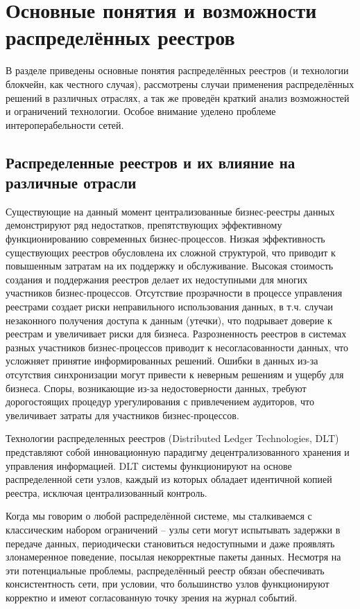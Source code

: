 \chapter{Основные понятия и возможности распределённых реестров}

В разделе приведены основные понятия распределённых реестров (и технологии блокчейн, как честного случая), рассмотрены случаи применения распределённых решений в различных отраслях, а так же проведён краткий анализ возможностей и ограничений технологии. Особое внимание уделено проблеме интероперабельности сетей.

\section{Распределенные реестров и их влияние на различные отрасли}

Существующие на данный момент централизованные бизнес-реестры данных демонстрируют ряд недостатков, препятствующих эффективному функционированию современных бизнес-процессов. Низкая эффективность существующих реестров обусловлена их сложной структурой, что приводит к повышенным затратам на их поддержку и обслуживание. Высокая стоимость создания и поддержания реестров делает их недоступными для многих участников бизнес-процессов. Отсутствие прозрачности в процессе управления реестрами создает риски неправильного использования данных, в т.ч. случаи незаконного получения доступа к данным (утечки), что подрывает доверие к реестрам и увеличивает риски для бизнеса. Разрозненность реестров в системах разных участников бизнес-процессов приводит к несогласованности данных, что усложняет принятие информированных решений. Ошибки в данных из-за отсутствия синхронизации могут привести к неверным решениям и ущербу для бизнеса. Споры, возникающие из-за недостоверности данных, требуют дорогостоящих процедур урегулирования с привлечением аудиторов, что увеличивает затраты для участников бизнес-процессов\cite{label30}.

Технологии распределенных реестров (Distributed Ledger Technologies, DLT) представляют собой инновационную парадигму децентрализованного хранения и управления информацией. DLT системы функционируют на основе распределенной сети узлов, каждый из которых обладает идентичной копией реестра, исключая централизованный контроль\cite{label39}.

Когда мы говорим о любой распределённой системе, мы сталкиваемся с классическим набором ограничений -- узлы сети могут испытывать задержки в передаче данных, периодически становиться недоступными и даже проявлять злонамеренное поведение, посылая некорректные пакеты данных. Несмотря на эти потенциальные проблемы, распределённый реестр обязан обеспечивать консистентность сети, при условии, что большинство узлов функционируют корректно и имеют согласованную точку зрения на журнал событий\cite{label15}.

